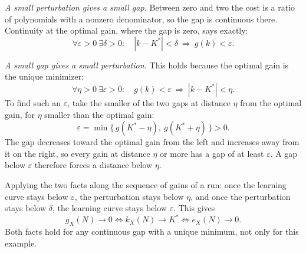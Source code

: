 \documentclass[11pt]{article}
\begin{document}
\emph{A small perturbation gives a small gap.} Between zero and two the cost is a ratio of
polynomials with a nonzero denominator, so the gap is continuous there. Continuity at the optimal
gain, where the gap is zero, says exactly:
\[
  \forall \varepsilon > 0 \ \exists \delta > 0 : \quad
  |k - K^*| < \delta \ \Longrightarrow\ g(k) < \varepsilon .
\]

\emph{A small gap gives a small perturbation.} This holds because the optimal gain is the unique
minimizer:
\[
  \forall \eta > 0 \ \exists \varepsilon > 0 : \quad
  g(k) < \varepsilon \ \Longrightarrow\ |k - K^*| < \eta .
\]
To find such an $\varepsilon$, take the smaller of the two gaps at distance $\eta$ from the optimal
gain, for $\eta$ smaller than the optimal gain:
\[
  \varepsilon = \min\big\{\, g(K^* - \eta),\ g(K^* + \eta) \,\big\} > 0 .
\]
The gap decreases toward the optimal gain from the left and increases away from it on the right, so
every gain at distance $\eta$ or more has a gap of at least $\varepsilon$. A gap below
$\varepsilon$ therefore forces a distance below $\eta$.

Applying the two facts along the sequence of gains of a run: once the learning curve stays below
$\varepsilon$, the perturbation stays below $\eta$, and once the perturbation stays below $\delta$,
the learning curve stays below $\varepsilon$. This gives
\[
  g_X(N) \to 0 \iff k_X(N) \to K^* \iff e_X(N) \to 0 .
\]
Both facts hold for any continuous gap with a unique minimum, not only for this example.
\end{document}
